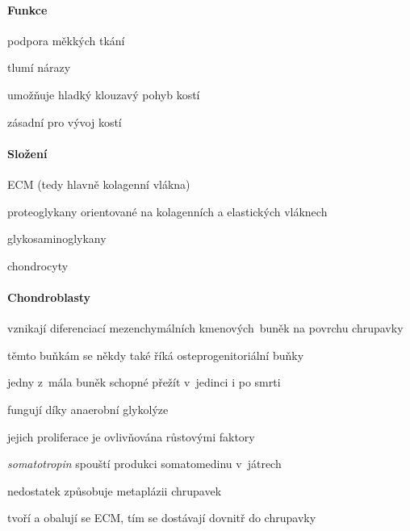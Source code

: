 \documentclass[DIV=8]{scrreprt}
\begin{document}

\paragraph{Funkce}
\begin{myItemize}[nosep]
    \item podpora měkkých tkání
    \item tlumí nárazy
    \item umožňuje hladký klouzavý pohyb kostí
    \item zásadní pro vývoj kostí
\end{myItemize}



\paragraph{Složení}
\begin{myItemize}[nosep]
    \item ECM (tedy hlavně kolagenní vlákna)
    \item proteoglykany orientované na kolagenních a elastických vláknech
    \item glykosaminoglykany
    \item chondrocyty
\end{myItemize}



\paragraph{Chondroblasty}
\begin{myItemize}[nosep]
    \item vznikají diferenciací mezenchymálních kmenových buněk na povrchu chrupavky
\begin{myItemize}[nosep]
    \item těmto buňkám se někdy také říká osteprogenitoriální buňky
\end{myItemize}

    \item jedny z mála buněk schopné přežít v jedinci i po smrti
    \item fungují díky anaerobní glykolýze
    \item jejich proliferace je ovlivňována růstovými faktory
\begin{myItemize}[nosep]
    \item \emph{somatotropin} spouští produkci somatomedinu v játrech
    \item nedostatek způsobuje metaplázii chrupavek
\end{myItemize}

    \item tvoří a obalují se ECM, tím se dostávají dovnitř do chrupavky
\end{myItemize}
\end{document}
